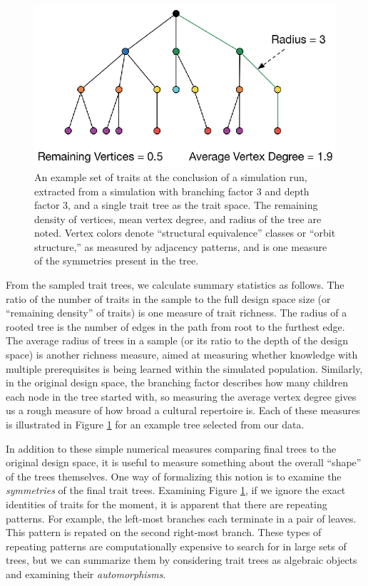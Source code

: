 \begin{figure}[htbp] 
\centering 
\includegraphics[]{graphics/semanticaxelrod/equil-trait-tree.eps} 
\caption{An example set of traits at the conclusion of a simulation run, extracted from a simulation with branching factor 3 and depth factor 3, and a single trait tree as the trait space.  The remaining density of vertices, mean vertex degree, and radius of the tree are noted.  Vertex colors denote ``structural equivalence'' classes or ``orbit structure,'' as measured by adjacency patterns, and is one measure of the symmetries present in the tree.} 
\label{img:final-tree} 
\end{figure}

From the sampled trait trees, we calculate summary statistics as
follows. The ratio of the number of traits in the sample to the full
design space size (or ``remaining density'' of traits) is one measure of
trait richness. The radius of a rooted tree is the number of edges in
the path from root to the furthest edge. The average radius of trees in
a sample (or its ratio to the depth of the design space) is another
richness measure, aimed at measuring whether knowledge with multiple
prerequisites is being learned within the simulated population.
Similarly, in the original design space, the branching factor describes
how many children each node in the tree started with, so measuring the
average vertex degree gives us a rough measure of how broad a cultural
repertoire is. Each of these measures is illustrated in Figure
\ref{img:final-tree} for an example tree selected from our data.

In addition to these simple numerical measures comparing final trees to
the original design space, it is useful to measure something about the
overall ``shape'' of the trees themselves. One way of formalizing this
notion is to examine the \emph{symmetries} of the final trait trees.
Examining Figure \ref{img:final-tree}, if we ignore the exact identities
of traits for the moment, it is apparent that there are repeating
patterns. For example, the left-most branches each terminate in a pair
of leaves. This pattern is repated on the second right-most branch.
These types of repeating patterns are computationally expensive to
search for in large sets of trees, but we can summarize them by
considering trait trees as algebraic objects and examining their
\emph{automorphisms}.


